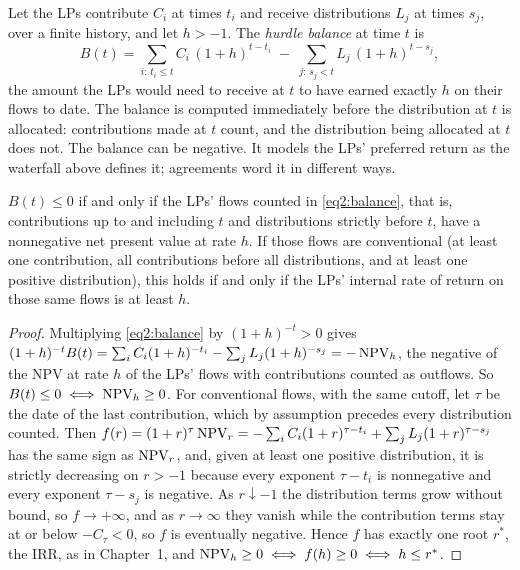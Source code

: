 \begin{chapterrefs}
\begin{definition}\label{def2:balance}
Let the LPs contribute $C_i$ at times $t_i$ and receive distributions $L_j$ at times $s_j$, over a
finite history, and let $h>-1$. The \emph{hurdle balance} at time $t$ is
\begin{equation}\label{eq2:balance}
  B(t) = \sum_{i:\,t_i\le t} C_i\,(1+h)^{t-t_i} \;-\; \sum_{j:\,s_j< t} L_j\,(1+h)^{t-s_j},
\end{equation}
the amount the LPs would need to receive at $t$ to have earned exactly $h$ on their flows to date.
The balance is computed immediately before the distribution at $t$ is allocated: contributions made
at $t$ count, and the distribution being allocated at $t$ does not. The balance can be
negative. It models the LPs' preferred return as the waterfall above defines it; agreements word it in different ways.
\end{definition}

\begin{proposition}\label{prop2:balance}
$B(t) \le 0$ if and only if the LPs' flows counted in \cref{eq2:balance}, that is, contributions up to
and including $t$ and distributions strictly before $t$, have a nonnegative net present value at rate $h$.
If those flows are conventional (at least one contribution, all contributions before all
distributions, and at least one positive distribution), this holds if and only if the LPs' internal
rate of return on those same flows is at least $h$.
\end{proposition}
\begin{proof}
Multiplying \cref{eq2:balance} by $(1+h)^{-t} > 0$ gives
$(1+h)^{-t}B(t) = \sum_i C_i (1+h)^{-t_i} - \sum_j L_j (1+h)^{-s_j} = -\operatorname{NPV}_h$, the negative of the NPV
at rate $h$ of the LPs' flows with contributions counted as outflows. So $B(t)\le 0 \iff \operatorname{NPV}_h \ge 0$.
For conventional flows, with the same cutoff, let $\tau$ be the date of the last contribution, which by
assumption precedes every distribution counted. Then $f(r) = (1+r)^{\tau}\operatorname{NPV}_r = -\sum_i C_i(1+r)^{\tau-t_i} + \sum_j L_j(1+r)^{\tau-s_j}$
has the same sign as $\operatorname{NPV}_r$, and, given at least one positive distribution, it is strictly
decreasing on $r > -1$ because every exponent
$\tau - t_i$ is nonnegative and every exponent $\tau - s_j$ is negative. As $r\downarrow-1$ the distribution terms grow without bound, so $f\to+\infty$, and as $r\to\infty$ they
vanish while the contribution terms stay at or below $-C_\tau<0$, so $f$ is eventually negative. Hence
$f$ has exactly one root $r^*$, the IRR, as in Chapter~1, and $\operatorname{NPV}_h \ge 0 \iff f(h) \ge 0 \iff h \le r^*$.
\end{proof}


\end{chapterrefs}
